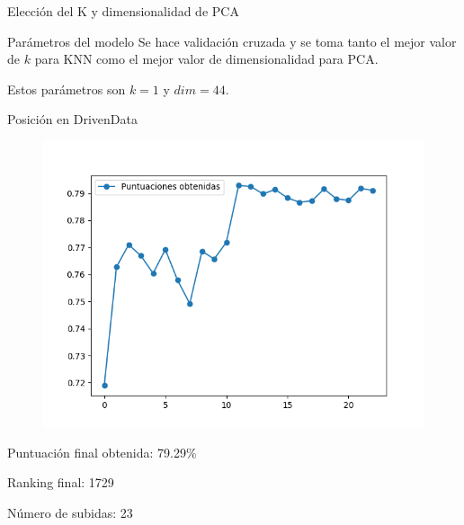 \begin{frame}{Elección del K y dimensionalidad de PCA}
	\vspace{10px}
	\pause
	\begin{block}{Parámetros del modelo}
		Se hace validación cruzada y se toma tanto el mejor valor de $k$ para KNN como el mejor valor de dimensionalidad para PCA.
		
		Estos parámetros son $k=1$ y $dim=44$.
	\end{block}
\end{frame}

\begin{frame}{Posición en DrivenData}

	\begin{figure}[H]
		\centering
		\includegraphics[scale=0.45]{./figures/knn/scores.png}
	\end{figure}

	\centering
	Puntuación final obtenida: 79.29\%
	
	Ranking final: 1729
	
	Número de subidas: 23
    
\end{frame}

